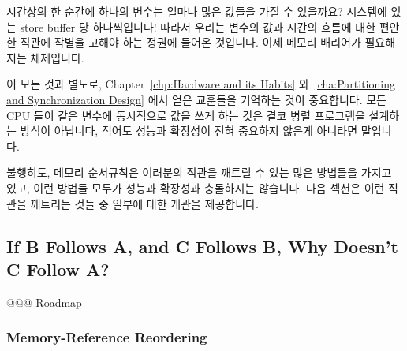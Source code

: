 시간상의 한 순간에 하나의 변수는 얼마나 많은 값들을 가질 수 있을까요?
시스템에 있는 store buffer 당 하나씩입니다!
따라서 우리는 변수의 값과 시간의 흐름에 대한 편안한 직관에 작별을 고해야 하는
정권에 들어온 것입니다.
이제 메모리 배리어가 필요해지는 체제입니다.

이 모든 것과 별도로, Chapter~\ref{chp:Hardware and its Habits}
와~\ref{cha:Partitioning and Synchronization Design} 에서 얻은 교훈들을
기억하는 것이 중요합니다.
모든 CPU 들이 같은 변수에 동시적으로 값을 쓰게 하는 것은 결코 병렬 프로그램을
설계하는 방식이 아닙니다, 적어도 성능과 확장성이 전혀 중요하지 않은게 아니라면
말입니다.

불행히도, 메모리 순서규칙은 여러분의 직관을 깨트릴 수 있는 많은 방법들을 가지고
있고, 이런 방법들 모두가 성능과 확장성과 충돌하지는 않습니다.
다음 섹션은 이런 직관을 깨트리는 것들 중 일부에 대한 개관을 제공합니다.

\subsection{If B Follows A, and C Follows B, Why Doesn't C Follow A?}
\label{sec:advsync:If B Follows A, and C Follows B, Why Doesn't C Follow A?}

@@@ Roadmap

\subsubsection{Memory-Reference Reordering}
\label{sec:advsync:Memory-Reference Reordering}

